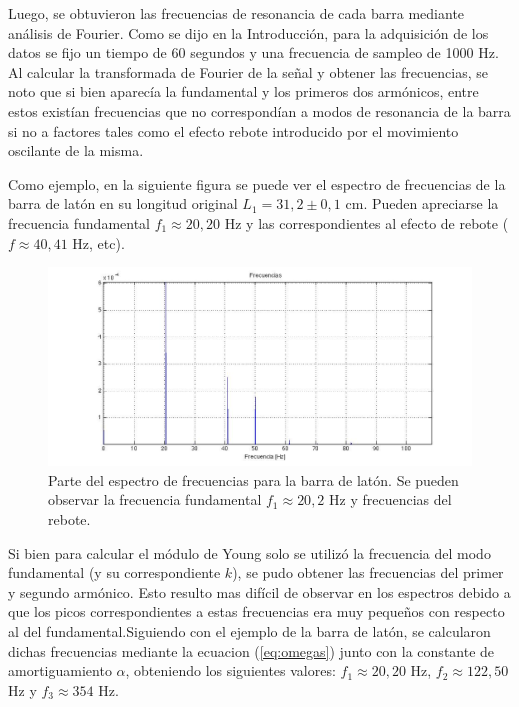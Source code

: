 \documentclass[twoside,twocolumn,a4paper]{article}
\begin{document}
Luego, se obtuvieron las frecuencias de resonancia de cada barra mediante an\'alisis de Fourier. Como se dijo en la Introducci\'on, para la adquisici\'on de los datos se fijo un tiempo de 60 segundos y una frecuencia de sampleo de 1000 Hz. Al calcular la transformada de Fourier de la se\~nal y obtener las frecuencias, se noto que si bien aparec\'ia la fundamental y los primeros dos arm\'onicos, entre estos exist\'ian frecuencias que no correspond\'ian a modos de resonancia de la barra si no a factores tales como el efecto rebote introducido por el movimiento oscilante de la misma.

Como ejemplo, en la siguiente figura se puede ver el espectro de frecuencias de la barra de lat\'on en su longitud original $L_{1} = 31,2 \pm 0,1$ cm. Pueden apreciarse la frecuencia fundamental $f_{1} \approx 20,20$ Hz y las correspondientes al efecto de rebote ($f \approx 40,41$ Hz, etc). \newline

\begin{figure}[H]
\includegraphics[width=\linewidth]{espectrolaton.jpg}
\caption{Parte del espectro de frecuencias para la barra de lat\'on. Se pueden observar la frecuencia fundamental $f_{1} \approx 20,2$ Hz y frecuencias del rebote.}
\label{fig:espectrolaton}
\end{figure}

Si bien para calcular el m\'odulo de Young solo se utiliz\'o la frecuencia del modo fundamental (y su correspondiente $k$), se pudo obtener las frecuencias del primer y segundo arm\'onico. Esto resulto mas dif\'icil de observar en los espectros debido a que los picos correspondientes a estas frecuencias era muy peque\~nos con respecto al del fundamental.\newline Siguiendo con el ejemplo de la barra de lat\'on, se calcularon dichas frecuencias mediante la ecuacion (\ref{eq:omegas}) junto con la constante de amortiguamiento $\alpha$, obteniendo los siguientes valores: $f_{1} \approx 20,20$ Hz, $f_{2} \approx 122,50$ Hz y $f_{3} \approx 354$ Hz. \newline
\end{document}
